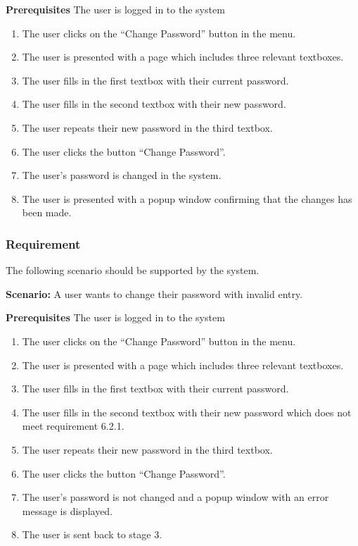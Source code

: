 \documentclass{article}
\begin{document}
\textbf{Prerequisites} The user is logged in to the system

\begin{enumerate}
    \item The user clicks on the “Change Password” button in the menu.
    \item The user is presented with a page which includes three relevant textboxes.
    \item The user fills in the first textbox with their current password.
    \item The user fills in the second textbox with their new password.
    \item The user repeats their new password in the third textbox.
    \item The user clicks the button “Change Password”.
    \item The user's password is changed in the system.
    \item The user is presented with a popup window confirming that the changes has been made.
\end{enumerate}



\subsubsection{Requirement}
The following scenario should be supported by the system.

\textbf{Scenario:} A user wants to change their password with invalid entry.

\textbf{Prerequisites} The user is logged in to the system

\begin{enumerate}
    \item The user clicks on the “Change Password” button in the menu.
    \item The user is presented with a page which includes three relevant textboxes.
    \item The user fills in the first textbox with their current password.
    \item The user fills in the second textbox with their new password which does not meet requirement 6.2.1.
    \item The user repeats their new password in the third textbox.
    \item The user clicks the button “Change Password”.
    \item The user's password is not changed and a popup window with an error message is displayed.
    \item The user is sent back to stage 3.
\end{enumerate}
\end{document}
